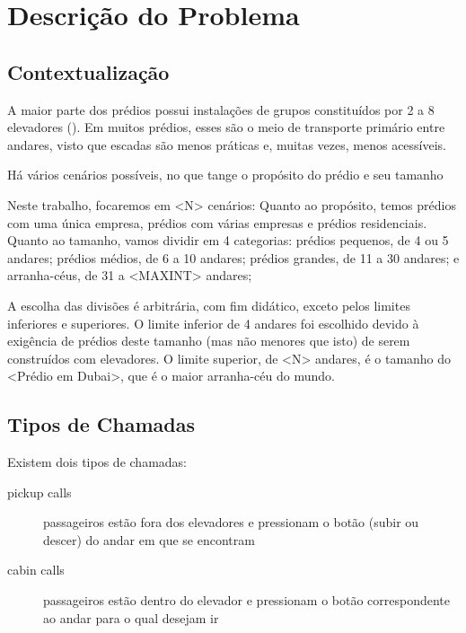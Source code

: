 \chapter{\label{chap:problem}Descrição do Problema}

\section{Contextualização}

A maior parte dos prédios possui instalações de grupos constituídos por 2 a 8
elevadores (\cite{KOEHLEROTTIGER02}). Em muitos prédios, esses são o meio de
transporte primário entre andares, visto que escadas são menos práticas e,
muitas vezes, menos acessíveis. %

Há vários cenários possíveis, no que tange o propósito do prédio e seu tamanho

Neste trabalho, focaremos em <N> cenários: Quanto ao propósito, temos prédios
com uma única empresa, prédios com várias empresas e prédios residenciais.
Quanto ao tamanho, vamos dividir em 4 categorias: prédios pequenos, de 4 ou 5
andares; prédios médios, de 6 a 10 andares; prédios grandes, de 11 a 30 andares;
e arranha-céus, de 31 a <MAXINT> andares;



A escolha das divisões é arbitrária, com fim didático, exceto pelos limites
inferiores e superiores. O limite inferior de 4 andares foi escolhido devido à
exigência de prédios deste tamanho (mas não menores que isto) de serem
construídos com elevadores. O limite superior, de <N> andares, é o tamanho do
<Prédio em Dubai>, que é o maior arranha-céu do mundo.

\section{Tipos de Chamadas}

Existem dois tipos de chamadas:

\begin{description}
\item[pickup calls] passageiros estão fora dos elevadores e pressionam o botão (subir ou descer) do andar em que se encontram
\item[cabin calls] passageiros estão dentro do elevador e pressionam o botão correspondente ao andar para o qual desejam ir
\end{description}

